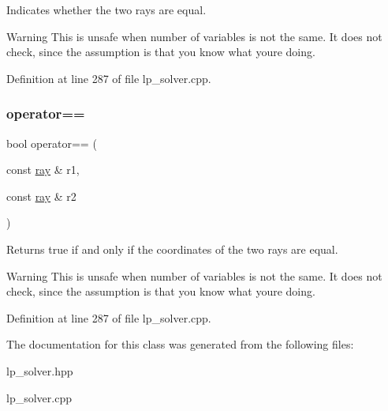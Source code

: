 Indicates whether the two rays are equal. 

\begin{DoxyWarning}{Warning}
This is unsafe when number of variables is not the same. It does not check, since the assumption is that you know what you\textquotesingle{}re doing. 
\end{DoxyWarning}


Definition at line 287 of file lp\+\_\+solver.\+cpp.

\mbox{\label{classray_ae27bf49e1b2756797f82fea0bf810dfd}} 
\subsubsection{\texorpdfstring{operator==}{operator==}\hspace{0.1cm}{\footnotesize\ttfamily [2/2]}}
{\footnotesize\ttfamily bool operator== (\begin{DoxyParamCaption}\item[{const \hyperlink{classray}{ray} \&}]{r1,  }\item[{const \hyperlink{classray}{ray} \&}]{r2 }\end{DoxyParamCaption})\hspace{0.3cm}{\ttfamily [friend]}}



Returns {\ttfamily true} if and only if the coordinates of the two rays are equal. 

\begin{DoxyWarning}{Warning}
This is unsafe when number of variables is not the same. It does not check, since the assumption is that you know what you\textquotesingle{}re doing. 
\end{DoxyWarning}


Definition at line 287 of file lp\+\_\+solver.\+cpp.



The documentation for this class was generated from the following files\+:\begin{DoxyCompactItemize}
\item 
lp\+\_\+solver.\+hpp\item 
lp\+\_\+solver.\+cpp\end{DoxyCompactItemize}
